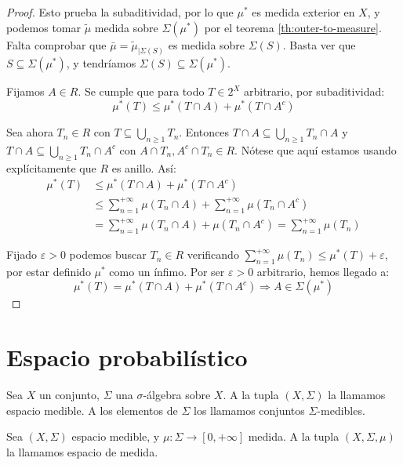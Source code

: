 \begin{proof}
   Esto prueba la subaditividad, por lo que $\mu^\ast$ es medida exterior en $X$, y podemos tomar $\widetilde{\mu}$ medida 
   sobre $\Sigma(\mu^\ast)$ por el teorema \ref{th:outer-to-measure}. Falta comprobar que $\bar{\mu} = \widetilde{\mu}_{|\Sigma(S)}$ es medida sobre $\Sigma(S)$. Basta ver que 
   $S\subseteq \Sigma(\mu^\ast)$, y tendríamos $\Sigma(S) \subseteq \Sigma(\mu^\ast)$.
   
   Fijamos $A\in R$. Se cumple que para todo $T\in 2^X$ arbitrario, por subaditividad:
   \[
     \mu^\ast(T) \le \mu^\ast(T\cap A) + \mu^\ast(T\cap A^c)
   \]
   
   Sea ahora $T_n \in R$ con $T\subseteq \bigcup_{n\ge 1} T_n$. Entonces 
   $T\cap A \subseteq \bigcup_{n\ge 1} T_n \cap A$ y $T\cap A \subseteq \bigcup_{n\ge 1} T_n \cap A^c$ con 
   $A\cap T_n, A^c \cap T_n \in R$. Nótese que aquí estamos usando explícitamente que $R$ es anillo. Así:
   \begin{align*}
   \mu^\ast(T) &\le \mu^\ast(T\cap A) + \mu^\ast(T\cap A^c)\\ 
               &\le \sum_{n=1}^{+\infty}\mu(T_n \cap A) + \sum_{n=1}^{+\infty} \mu(T_n \cap A^c)\\
               &= \sum_{n=1}^{+\infty}\mu(T_n \cap A) + \mu(T_n \cap A^c) = \sum_{n=1}^{+\infty} \mu(T_n)  
   \end{align*}
   
   Fijado $\varepsilon > 0$ podemos buscar $T_n \in R$ verificando $\sum_{n=1}^{+\infty} \mu(T_n) \le \mu^\ast(T) + \varepsilon$, 
   por estar definido $\mu^\ast$ como un ínfimo. Por ser $\varepsilon > 0$ arbitrario, hemos llegado a: 
   \[
     \mu^\ast(T) = \mu^\ast(T\cap A) + \mu^\ast(T\cap A^c) \Rightarrow A\in \Sigma(\mu^\ast)
   \]
  \end{proof}



\section{Espacio probabilístico}
\label{sec:prob-space}
\begin{definition}
 Sea $X$ un conjunto, $\Sigma$ una $\sigma$-álgebra sobre $X$. A la tupla $(X,\Sigma)$ la llamamos
 espacio medible. A los elementos de $\Sigma$ los llamamos conjuntos $\Sigma$-medibles.
\end{definition}


\begin{definition}
 Sea $(X, \Sigma)$ espacio medible, y $\mu: \Sigma \rightarrow [0,+\infty]$ medida. A la tupla $(X, \Sigma, \mu)$ 
 la llamamos espacio de medida.
\end{definition}


